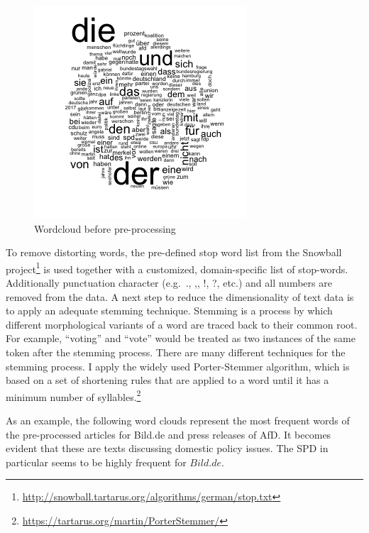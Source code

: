 \documentclass[
]{article}
\begin{document}
\begin{figure}
\centering
\includegraphics{../figs/wordcloud.png}
\caption{Wordcloud before pre-processing}
\end{figure}

To remove distorting words, the pre-defined stop word list from the
Snowball project\footnote{\url{http://snowball.tartarus.org/algorithms/german/stop.txt}}
is used together with a customized, domain-specific list of stop-words.
Additionally punctuation character (e.g.~., ,, !, ?, etc.) and all
numbers are removed from the data. A next step to reduce the
dimensionality of text data is to apply an adequate stemming technique.
Stemming is a process by which different morphological variants of a
word are traced back to their common root. For example, ``voting'' and
``vote'' would be treated as two instances of the same token after the
stemming process. There are many different techniques for the stemming
process. I apply the widely used Porter-Stemmer algorithm, which is
based on a set of shortening rules that are applied to a word until it
has a minimum number of syllables.\footnote{\url{https://tartarus.org/martin/PorterStemmer/}}

As an example, the following word clouds represent the most frequent
words of the pre-processed articles for Bild.de and press releases of
AfD. It becomes evident that these are texts discussing domestic policy
issues. The SPD in particular seems to be highly frequent for
\(Bild.de\).
\end{document}
